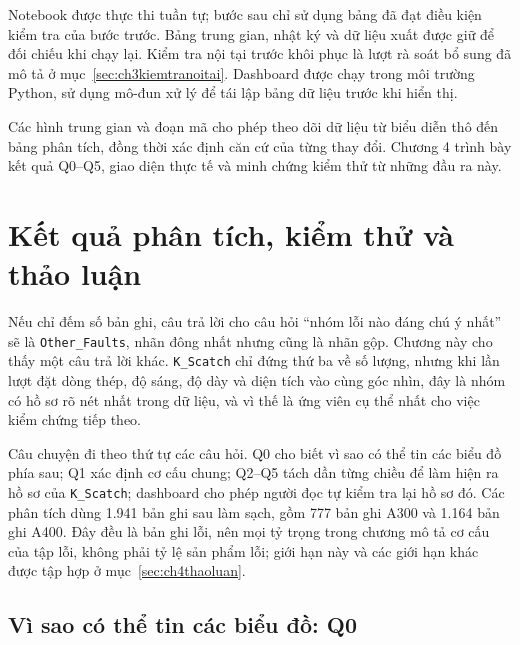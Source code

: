 \documentclass[12pt,a4paper,oneside]{report}
\newcommand{\maCot}[1]{{\urlstyle{tt}\def\UrlBreaks{\do\_\do\/\do\.}\def\UrlBigBreaks{}\nolinkurl{#1}}}
\begin{document}
Notebook được thực thi tuần tự; bước sau chỉ sử dụng bảng đã đạt điều kiện kiểm tra của bước trước. Bảng trung gian, nhật ký và dữ liệu xuất được giữ để đối chiếu khi chạy lại. Kiểm tra nội tại trước khôi phục là lượt rà soát bổ sung đã mô tả ở mục~\ref{sec:ch3kiemtranoitai}. Dashboard được chạy trong môi trường Python, sử dụng mô-đun xử lý để tái lập bảng dữ liệu trước khi hiển thị.

Các hình trung gian và đoạn mã cho phép theo dõi dữ liệu từ biểu diễn thô đến bảng phân tích, đồng thời xác định căn cứ của từng thay đổi. Chương 4 trình bày kết quả Q0--Q5, giao diện thực tế và minh chứng kiểm thử từ những đầu ra này.

\chapter{Kết quả phân tích, kiểm thử và thảo luận}
\label{chap:ketqua}

\newcommand{\ghiChuHinh}[1]{\fbox{\parbox{0.92\linewidth}{\small\setstretch{1.1}\textbf{[CẦN CHÈN ẢNH]}\newline #1}}}

Nếu chỉ đếm số bản ghi, câu trả lời cho câu hỏi ``nhóm lỗi nào đáng chú ý nhất'' sẽ là \maCot{Other_Faults}, nhãn đông nhất nhưng cũng là nhãn gộp. Chương này cho thấy một câu trả lời khác. \maCot{K_Scatch} chỉ đứng thứ ba về số lượng, nhưng khi lần lượt đặt dòng thép, độ sáng, độ dày và diện tích vào cùng góc nhìn, đây là nhóm có hồ sơ rõ nét nhất trong dữ liệu, và vì thế là ứng viên cụ thể nhất cho việc kiểm chứng tiếp theo.

Câu chuyện đi theo thứ tự các câu hỏi. Q0 cho biết vì sao có thể tin các biểu đồ phía sau; Q1 xác định cơ cấu chung; Q2--Q5 tách dần từng chiều để làm hiện ra hồ sơ của \maCot{K_Scatch}; dashboard cho phép người đọc tự kiểm tra lại hồ sơ đó. Các phân tích dùng 1.941 bản ghi sau làm sạch, gồm 777 bản ghi A300 và 1.164 bản ghi A400. Đây đều là bản ghi lỗi, nên mọi tỷ trọng trong chương mô tả cơ cấu của tập lỗi, không phải tỷ lệ sản phẩm lỗi; giới hạn này và các giới hạn khác được tập hợp ở mục~\ref{sec:ch4thaoluan}.

\section{Vì sao có thể tin các biểu đồ: Q0}
\label{sec:ch4q0}
\end{document}
